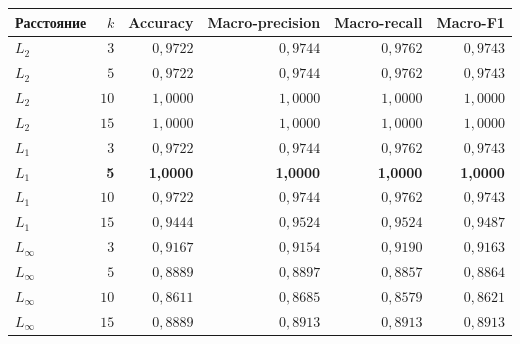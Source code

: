 \begin{tabular}{lrrrrr}
\toprule
Расстояние & $k$ & Accuracy & Macro-precision & Macro-recall & Macro-F1 \\
\midrule
$L_2$ & $3$ & $0{,}9722$ & $0{,}9744$ & $0{,}9762$ & $0{,}9743$ \\
$L_2$ & $5$ & $0{,}9722$ & $0{,}9744$ & $0{,}9762$ & $0{,}9743$ \\
$L_2$ & $10$ & $1{,}0000$ & $1{,}0000$ & $1{,}0000$ & $1{,}0000$ \\
$L_2$ & $15$ & $1{,}0000$ & $1{,}0000$ & $1{,}0000$ & $1{,}0000$ \\
$L_1$ & $3$ & $0{,}9722$ & $0{,}9744$ & $0{,}9762$ & $0{,}9743$ \\
$L_1$ & \textbf{5} & \textbf{1,0000} & \textbf{1,0000} & \textbf{1,0000} & \textbf{1,0000} \\
$L_1$ & $10$ & $0{,}9722$ & $0{,}9744$ & $0{,}9762$ & $0{,}9743$ \\
$L_1$ & $15$ & $0{,}9444$ & $0{,}9524$ & $0{,}9524$ & $0{,}9487$ \\
$L_\infty$ & $3$ & $0{,}9167$ & $0{,}9154$ & $0{,}9190$ & $0{,}9163$ \\
$L_\infty$ & $5$ & $0{,}8889$ & $0{,}8897$ & $0{,}8857$ & $0{,}8864$ \\
$L_\infty$ & $10$ & $0{,}8611$ & $0{,}8685$ & $0{,}8579$ & $0{,}8621$ \\
$L_\infty$ & $15$ & $0{,}8889$ & $0{,}8913$ & $0{,}8913$ & $0{,}8913$ \\
\bottomrule
\end{tabular}
